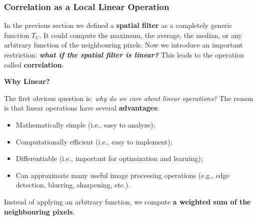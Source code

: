 \subsubsection{Correlation as a Local Linear Operation}\label{sec:correlation-as-a-local-linear-operation}

In the previous section we defined a \textbf{spatial filter} as a completely generic function $T_{U}$. It could compute the maximum, the average, the median, or any arbitrary function of the neighbouring pixels. Now we introduce an important restriction: \textbf{\emph{what if the spatial filter is linear?}} This leads to the operation called \textbf{correlation}.

\highspace
\begin{flushleft}
    \textcolor{Green3}{ \textbf{Why Linear?}}
\end{flushleft}
The first obvious question is: \emph{why do we care about linear operations?} The reason is that linear operations have several \textbf{advantages}:
\begin{itemize}
    \item Mathematically simple (i.e., easy to analyze);
    \item Computationally efficient (i.e., easy to implement);
    \item Differentiable (i.e., important for optimization and learning);
    \item Can approximate many useful image processing operations (e.g., edge detection, blurring, sharpening, etc.).
\end{itemize}
Instead of applying an arbitrary function, we compute \textbf{a weighted sum of the neighbouring pixels}.

